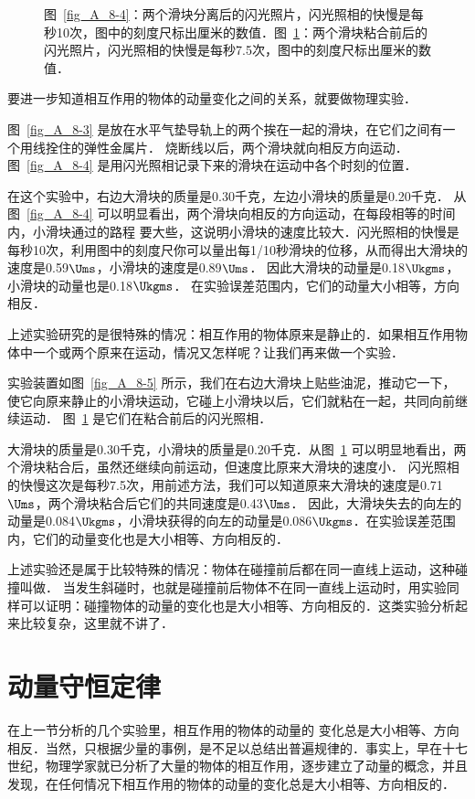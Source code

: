 \begin{figure}[htbp]
\begin{minipage}[t]{0.24\linewidth}
        \caption{}\label{fig_A_8-6}
    \end{minipage}
    \caption*{图~\ref{fig_A_8-4}：两个滑块分离后的闪光照片，闪光照相的快慢是每秒10次，图中的刻度尺标出厘米的数值．图~\ref{fig_A_8-6}：两个滑块粘合前后的闪光照片，闪光照相的快慢是每秒7.5次，图中的刻度尺标出厘米的数值．}
\end{figure}


要进一步知道相互作用的物体的动量变化之间的关系，就要做物理实验．

图~\ref{fig_A_8-3} 是放在水平气垫导轨上的两个挨在一起的滑块，在它们之间有一个用线拴住的弹性金属片．
烧断线以后，两个滑块就向相反方向运动．
图~\ref{fig_A_8-4} 是用闪光照相记录下来的滑块在运动中各个时刻的位置．

在这个实验中，右边大滑块的质量是0.30千克，左边小滑块的质量是0.20千克．
从图~\ref{fig_A_8-4} 可以明显看出，两个滑块向相反的方向运动，在每段相等的时间内，小滑块通过的路程
要大些，这说明小滑块的速度比较大．闪光照相的快慢是每秒10次，利用图中的刻度尺你可以量出每1/10秒滑块的位移，从而得出大滑块的速度是0.59$\Ums$，小滑块的速度是0.89$\Ums$．
因此大滑块的动量是0.18$\Ukgms$，小滑块的动量也是0.18$\Ukgms$．
在实验误差范围内，它们的动量大小相等，方向相反．

上述实验研究的是很特殊的情况：相互作用的物体原来是静止的．如果相互作用物体中一个或两个原来在运动，情况又怎样呢？让我们再来做一个实验．

实验装置如图~\ref{fig_A_8-5} 所示，我们在右边大滑块上贴些油泥，推动它一下，使它向原来静止的小滑块运动，它碰上小滑块以后，它们就粘在一起，共同向前继续运动．
图~\ref{fig_A_8-6} 是它们在粘合前后的闪光照相．

大滑块的质量是0.30千克，小滑块的质量是0.20千克．从图~\ref{fig_A_8-6} 可以明显地看出，两个滑块粘合后，虽然还继续向前运动，但速度比原来大滑块的速度小．
闪光照相的快慢这次是每秒7.5次，用前述方法，我们可以知道原来大滑块的速度是0.71$\Ums$，两个滑块粘合后它们的共同速度是0.43$\Ums$．
因此，大滑块失去的向左的动量是0.084$\Ukgms$，小滑块获得的向左的动量是0.086$\Ukgms$．在实验误差范围内，它们的动量变化也是大小相等、方向相反的．

上述实验还是属于比较特殊的情况：物体在碰撞前后都在同一直线上运动，这种碰撞叫做．
当发生斜碰时，也就是碰撞前后物体不在同一直线上运动时，用实验同样可以证明：碰撞物体的动量的变化也是大小相等、方向相反的．这类实验分析起来比较复杂，这里就不讲了．

\section{动量守恒定律}\label{sec-A-08-law-of-conservation-of-momentum}
在上一节分析的几个实验里，相互作用的物体的动量的
变化总是大小相等、方向相反．当然，只根据少量的事例，是不足以总结出普遍规律的．事实上，早在十七世纪，物理学家就已分析了大量的物体的相互作用，逐步建立了动量的概念，并且发现，在任何情况下相互作用的物体的动量的变化总是大小相等、方向相反的．

